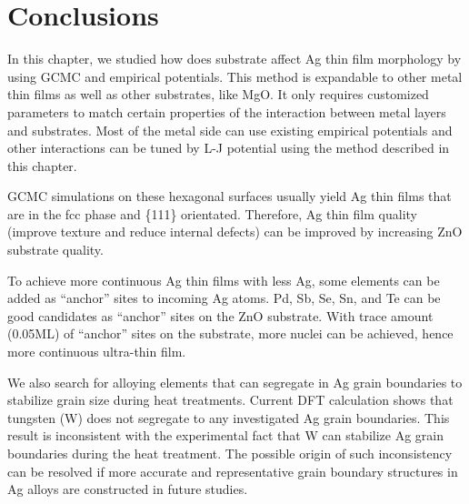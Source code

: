 \section{Conclusions}
In this chapter, we studied how does substrate affect Ag thin film morphology by using \ac{GCMC} and empirical potentials. This method is expandable to other metal thin films as well as other substrates, like MgO. It only requires customized parameters to match certain properties of the interaction between metal layers and substrates. Most of the metal side can use existing empirical potentials and other interactions can be tuned by L-J potential using the method described in this chapter.

\ac{GCMC} simulations on these hexagonal surfaces usually yield Ag thin films that are in the fcc phase and \{111\} orientated. Therefore, Ag thin film quality (improve texture and reduce internal defects) can be improved by increasing ZnO substrate quality.

To achieve more continuous Ag thin films with less Ag, some elements can be added as ``anchor'' sites to incoming Ag atoms. Pd, Sb, Se, Sn, and Te can be good candidates as ``anchor'' sites on the ZnO substrate. With trace amount (0.05\ac{ML}) of ``anchor'' sites on the substrate, more nuclei can be achieved, hence more continuous ultra-thin film.

We also search for alloying elements that can segregate in Ag grain boundaries to stabilize grain size during heat treatments. Current \ac{DFT} calculation shows that tungsten (W) does not segregate to any investigated Ag grain boundaries. This result is inconsistent with the experimental fact that W can stabilize Ag grain boundaries during the heat treatment. The possible origin of such inconsistency can be resolved if more accurate and representative grain boundary structures in Ag alloys are constructed in future studies.
